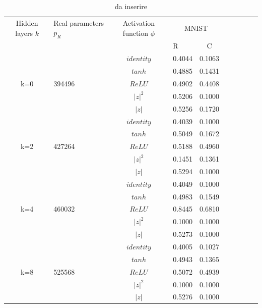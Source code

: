 \documentclass[a4paper,10pt]{article}
\begin{document}
 \begin{table}
  \centering
  \begin{tabular}{cp{} cp{}   cp{} cp{} cp{}}
   \cline{1-5}
   Hidden layers $k$ & Real parameters $p_R$ & Activation function $\phi$ & \multicolumn{2}{c}{MNIST}\\
   \cline{4-5}
   & & & R & C \\
   \cline{1-5}
   & & $identity$ & 0.4044 & 0.1063 \\
   \cline{3-5}
   & & $tanh$ & 0.4885 & 0.1431 \\
   \cline{3-5}
   k=0 & 394496 & $ReLU$ & 0.4902 & 0.4408 \\
   \cline{3-5}
   & & $|z|^2$ & 0.5206 & 0.1000 \\
   \cline{3-5}
   & & $|z|$ & 0.5256 & 0.1720 \\
   \cline{1-5}
  
   & & $identity$ & 0.4039 & 0.1000 \\
   \cline{3-5}
   & & $tanh$ & 0.5049 & 0.1672 \\
   \cline{3-5}
   k=2 & 427264 & $ReLU$ & 0.5188 & 0.4960 \\
   \cline{3-5}
   & & $|z|^2$ & 0.1451 & 0.1361 \\
   \cline{3-5}
   & & $|z|$ & 0.5294 & 0.1000 \\
   \cline{1-5}
  
   & & $identity$ & 0.4049 & 0.1000 \\
   \cline{3-5}
   & & $tanh$ & 0.4983 & 0.1549 \\
   \cline{3-5}
   k=4 & 460032 & $ReLU$ & 0.8445 & 0.6810 \\
   \cline{3-5}
   & & $|z|^2$ & 0.1000 & 0.1000 \\
   \cline{3-5}
   & & $|z|$ & 0.5273 & 0.1000 \\
   \cline{1-5}
   
   & & $identity$ & 0.4005 & 0.1027 \\
   \cline{3-5}
   & & $tanh$ & 0.4943 & 0.1365 \\
   \cline{3-5}
   k=8 & 525568 & $ReLU$ & 0.5072 & 0.4939 \\
   \cline{3-5}
   & & $|z|^2$ & 0.1000 & 0.1000 \\
   \cline{3-5}
   & & $|z|$ & 0.5276 & 0.1000 \\
   \cline{1-5}
  \end{tabular}
  \caption{da inserire}
  \label{CIFAR-101Tab}
 \end{table}
 
\end{document}
